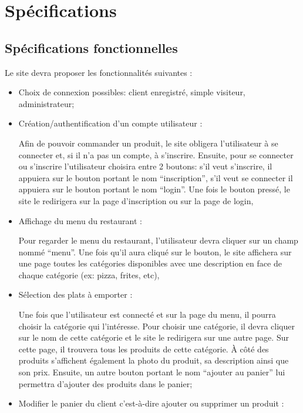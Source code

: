\section{Spécifications}
\subsection{Spécifications fonctionnelles}
Le site devra proposer les fonctionnalités suivantes :
\begin{itemize}
    \item Choix de connexion possibles: client enregistré, simple visiteur, administrateur;
    
    \item Création/authentification d’un compte utilisateur :
    
    Afin de pouvoir commander un produit, le site obligera l'utilisateur à se connecter et, si il n'a pas un compte, à s'inscrire. Ensuite, pour se connecter ou s'inscrire l'utilisateur choisira entre 2 boutons: s’il veut s’inscrire, il appuiera sur le bouton portant le nom “inscription”, s’il veut se connecter il appuiera sur le bouton portant le nom “login”. Une fois le bouton pressé, le site le redirigera sur la page d'inscription ou sur la page de login,
    
    \item Affichage du menu du restaurant :
    
    Pour regarder le menu du restaurant, l’utilisateur devra cliquer sur un champ nommé “menu”. Une fois qu’il aura cliqué sur le bouton, le site affichera sur une page toutes les catégories disponibles avec une description en face de chaque catégorie (ex: pizza, frites, etc),
    
    \item Sélection des plats à emporter :
    
    Une fois que l’utilisateur est connecté et sur la page du menu, il pourra choisir la catégorie qui l'intéresse. Pour choisir une catégorie, il devra cliquer sur le nom de cette catégorie et le site le redirigera sur une autre page. Sur cette page, il trouvera tous les produits de cette catégorie. À côté des produits s'affichent également la photo du produit, sa description ainsi que son prix. Ensuite, un autre bouton portant le nom “ajouter au panier” lui permettra d'ajouter des produits dans le panier;
    
    \item Modifier le panier du client c'est-à-dire ajouter ou supprimer un produit :
    

\end{itemize}
